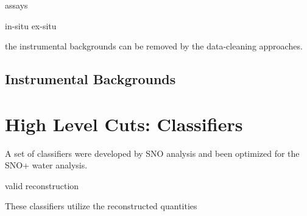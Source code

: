 assays


in-situ
ex-situ

the instrumental backgrounds can be removed by the data-cleaning approaches.



\subsection{Instrumental Backgrounds}





\section{High Level Cuts: Classifiers}

A set of classifiers were developed by SNO analysis and been optimized for the SNO+ water analysis\cite{highlevel}.

valid reconstruction


These classifiers utilize the reconstructed quantities

